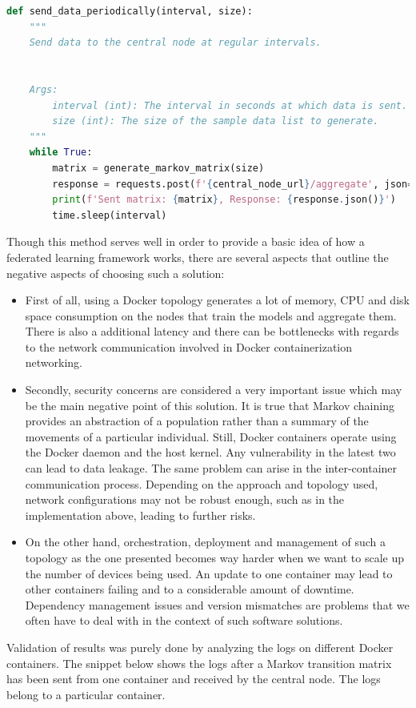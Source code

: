 \documentclass[conference]{IEEEtran}
\begin{document}
\begin{lstlisting}[language=Python]
 def send_data_periodically(interval, size):
    """
    Send data to the central node at regular intervals.


    Args:
        interval (int): The interval in seconds at which data is sent.
        size (int): The size of the sample data list to generate.
    """
    while True:
        matrix = generate_markov_matrix(size)
        response = requests.post(f'{central_node_url}/aggregate', json={'matrices': [matrix]})
        print(f'Sent matrix: {matrix}, Response: {response.json()}')
        time.sleep(interval)
\end{lstlisting}

Though this method serves well in order to provide a basic idea of how a federated learning framework works, there are several aspects that outline the negative aspects of choosing such a solution:
\begin{itemize}
  \item First of all, using a Docker topology generates a lot of memory, CPU and disk space consumption on the nodes that train the models and aggregate them. There is also a additional latency and there can be bottlenecks with regards to the network communication involved in Docker containerization networking.
  \item Secondly, security concerns are considered a very important issue which may be the main negative point of this solution. It is true that Markov chaining provides an abstraction of a population rather than a summary of the movements of a particular individual. Still, Docker containers operate using the Docker daemon and the host kernel. Any vulnerability in the latest two can lead to data leakage. The same problem can arise in the inter-container communication process. Depending on the approach and topology used, network configurations may not be robust enough, such as in the implementation above, leading to further risks.
  \item On the other hand, orchestration, deployment and management of such a topology as the one presented becomes way harder when we want to scale up the number of devices being used. An update to one container may lead to other containers failing and to a considerable amount of downtime. Dependency management issues and version mismatches are problems that we often have to deal with in the context of such software solutions.
\end{itemize}

Validation of results was purely done by analyzing the logs on different Docker containers. The snippet below shows the logs after a Markov transition matrix has been sent from one container and received by the central node. The logs belong to a particular container.
\end{document}
